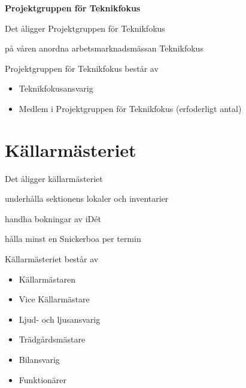 \documentclass[pdfbookmarks,a4paper,11pt]{article}
\newlength{\itemcollength}
\newenvironment{reglemlista}{%
  \begin{list}{}{%
      \setlength{\labelwidth}{\itemcollength}%
      \setlength{\leftmargin}{\labelwidth + \labelsep}%
      \renewcommand{\makelabel}[1]{%
        \raisebox{0pt}[1ex][0pt]{%
          \makebox[\labelwidth][l]{%
            \parbox[t]{\itemcollength}{%
              \raggedright\hspace{0pt}##1}}}\hfill}%
      }}{%
  \end{list}}
\begin{document}
\textbf{Projektgruppen för Teknikfokus}
\begin{reglemlista}
	\item[Åligganden]
	Det åligger Projektgruppen för Teknikfokus

	\begin{attlista}
		\item på våren anordna arbetsmarknadsmässan Teknikfokus
	\end{attlista}

	\item[Sammansättning]
	Projektgruppen för Teknikfokus består av
	\begin{itemize}
		\item Teknikfokusansvarig
		\item Medlem i Projektgruppen för Teknikfokus (erfoderligt antal)
	\end{itemize}

\end{reglemlista}


\section{Källarmästeriet}

\begin{reglemlista}

	\item[Åligganden]
	Det åligger källarmästeriet
	\begin{attlista}
		\item underhålla sektionens lokaler och inventarier
		\item handha bokningar av iDét
		\item hålla minst en Snickerboa per termin
	\end{attlista}


	\item[Sammansättning]
	Källarmästeriet består av
	\begin{itemize}
		\item Källarmästaren
		\item Vice Källarmästare
		\item Ljud- och ljusansvarig
		\item Trädgårdsmästare
        \item Bilansvarig
		\item Funktionärer
	\end{itemize}

\end{reglemlista}
\end{document}
